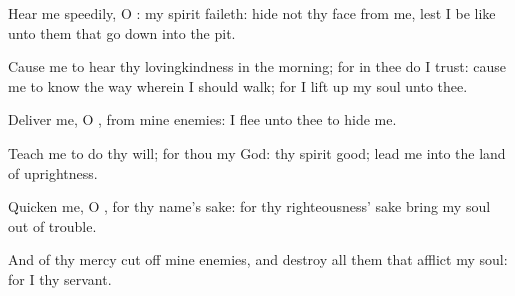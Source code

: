 {\Q {}Hear me
speedily, O
{}: my
spirit
faileth:
hide not thy
face from me, lest I be
like unto them that go
down into the
pit.


\par }{\Q {}Cause me to
hear thy
lovingkindness in the
morning; for in thee do I
trust: cause me to
know the
way
wherein I should
walk; for I lift
up my
soul unto thee.


\par }{\Q {}Deliver me, O
{}, from mine
enemies: I flee unto thee to
hide me.


\par }{\Q {}Teach me to
do thy
will; for thou
{} my
God: thy
spirit
{}
good;
lead me into the
land of
uprightness.


\par }{\Q {}Quicken me, O
{}, for thy
name’s sake: for thy
righteousness’ sake
bring my
soul out of
trouble.


\par }{\Q {}And of thy
mercy cut
off mine
enemies, and
destroy all them that
afflict my
soul: for I
{} thy
servant.




\par }
